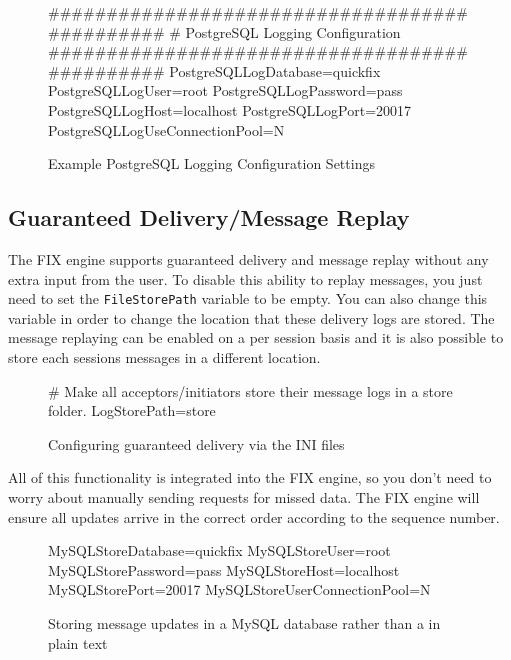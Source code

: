 \begin{figure}[H]
\begin{inicode}
	##############################################
	#       PostgreSQL Logging Configuration 
	##############################################
	PostgreSQLLogDatabase=quickfix
	PostgreSQLLogUser=root
	PostgreSQLLogPassword=pass
	PostgreSQLLogHost=localhost
	PostgreSQLLogPort=20017
	PostgreSQLLogUseConnectionPool=N
\end{inicode}
\caption{Example PostgreSQL Logging Configuration Settings}
\end{figure}

\subsection{Guaranteed Delivery/Message Replay}

The FIX engine supports guaranteed delivery and message replay without any extra input from the user. To disable this ability to replay messages, you just need to set the \verb|FileStorePath| variable to be empty. You can also change this variable in order to change the location that these delivery logs are stored. The message replaying can be enabled on a per session basis and it is also possible to store each sessions messages in a different location.

\begin{figure}[H]
\begin{inicode}
[DEFAULT]
# Make all acceptors/initiators store their message logs in a store folder.
LogStorePath=store
\end{inicode}
\caption{Configuring guaranteed delivery via the INI files}
\end{figure}

All of this functionality is integrated into the FIX engine, so you don't need to worry about manually sending requests for missed data. The FIX engine will ensure all updates arrive in the correct order according to the sequence number.

\begin{figure}[H]
\begin{inicode}
MySQLStoreDatabase=quickfix
MySQLStoreUser=root
MySQLStorePassword=pass
MySQLStoreHost=localhost
MySQLStorePort=20017
MySQLStoreUserConnectionPool=N
\end{inicode}
\caption{Storing message updates in a MySQL database rather than a in plain text}
\label{fig:sql-store}
\end{figure}

